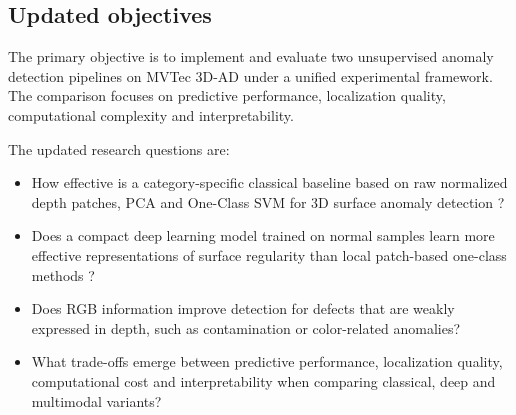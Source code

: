 \subsection*{Updated objectives}

The primary objective is to implement and evaluate two unsupervised anomaly detection pipelines on MVTec 3D-AD under a unified experimental framework. The comparison focuses on predictive performance, localization quality, computational complexity and interpretability.

The updated research questions are:
\begin{itemize}
    \item How effective is a category-specific classical baseline based on raw normalized depth patches, PCA and One-Class SVM for 3D surface anomaly detection \cite{scholkopf2001estimating}?
    \item Does a compact deep learning model trained on normal samples learn more effective representations of surface regularity than local patch-based one-class methods \cite{li2025surveyindustrialad}?
    \item Does RGB information improve detection for defects that are weakly expressed in depth, such as contamination or color-related anomalies?
    \item What trade-offs emerge between predictive performance, localization quality, computational cost and interpretability when comparing classical, deep and multimodal variants?
\end{itemize}
